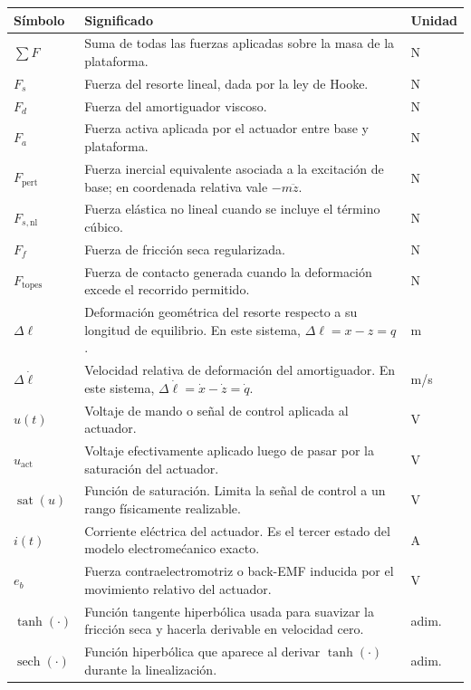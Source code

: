 \documentclass[11pt]{article}
\begin{document}
\begin{center}
\small
\begin{tabular}{>{\raggedright\arraybackslash}p{3.0cm} >{\raggedright\arraybackslash}p{9.0cm} >{\raggedright\arraybackslash}p{2.2cm}}
\toprule
\textbf{S\'imbolo} & \textbf{Significado} & \textbf{Unidad} \\
\midrule
$\sum F$ & Suma de todas las fuerzas aplicadas sobre la masa de la plataforma. & N \\
$F_s$ & Fuerza del resorte lineal, dada por la ley de Hooke. & N \\
$F_d$ & Fuerza del amortiguador viscoso. & N \\
$F_a$ & Fuerza activa aplicada por el actuador entre base y plataforma. & N \\
$F_{\text{pert}}$ & Fuerza inercial equivalente asociada a la excitaci\'on de base; en coordenada relativa vale $-m\ddot z$. & N \\
$F_{s,\text{nl}}$ & Fuerza el\'astica no lineal cuando se incluye el t\'ermino c\'ubico. & N \\
$F_f$ & Fuerza de fricci\'on seca regularizada. & N \\
$F_{\text{topes}}$ & Fuerza de contacto generada cuando la deformaci\'on excede el recorrido permitido. & N \\
$\Delta \ell$ & Deformaci\'on geom\'etrica del resorte respecto a su longitud de equilibrio. En este sistema, $\Delta \ell=x-z=q$. & m \\
$\Delta \dot \ell$ & Velocidad relativa de deformaci\'on del amortiguador. En este sistema, $\Delta \dot \ell=\dot x-\dot z=\dot q$. & m/s \\
$u(t)$ & Voltaje de mando o se\~nal de control aplicada al actuador. & V \\
$u_{\text{act}}$ & Voltaje efectivamente aplicado luego de pasar por la saturaci\'on del actuador. & V \\
$\operatorname{sat}(u)$ & Funci\'on de saturaci\'on. Limita la se\~nal de control a un rango f\'isicamente realizable. & V \\
$i(t)$ & Corriente el\'ectrica del actuador. Es el tercer estado del modelo electrome\'canico exacto. & A \\
$e_b$ & Fuerza contraelectromotriz o back-EMF inducida por el movimiento relativo del actuador. & V \\
$\tanh(\cdot)$ & Funci\'on tangente hiperb\'olica usada para suavizar la fricci\'on seca y hacerla derivable en velocidad cero. & adim. \\
$\operatorname{sech}(\cdot)$ & Funci\'on hiperb\'olica que aparece al derivar $\tanh(\cdot)$ durante la linealizaci\'on. & adim. \\
\bottomrule
\end{tabular}
\end{center}
\end{document}
